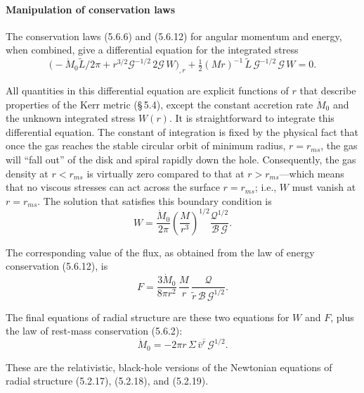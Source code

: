 \paragraph*{Manipulation of conservation laws}
The conservation laws (5.6.6) and (5.6.12) for angular momentum and energy,
when combined, give a differential equation for the integrated stress
%
\begin{equation}
\tag{5.6.13}
\bigl(-\dot{M}_0 \tilde{L}/2\pi
  + r^{3/2}\mathscr{G}^{-1/2}\,2\mathscr{G}\,W\bigr)_{,r}
  + \tfrac{1}{2}(Mr)^{-1}\,\tilde{L}\,\mathscr{G}^{-1/2}\,\mathscr{G}\,W = 0.
\end{equation}

All quantities in this differential equation are explicit functions of $r$ that
describe properties of the Kerr metric (\S\,5.4), except the constant accretion
rate $\dot{M}_0$ and the unknown integrated stress $W(r)$.  It is straightforward to integrate
this differential equation.  The constant of integration is fixed by the physical
fact that once the gas reaches the stable circular orbit of minimum radius,
$r = r_{ms}$, the gas will ``fall out'' of the disk and spiral rapidly down the hole.
Consequently, the gas density at $r < r_{ms}$ is virtually zero compared to that at
$r > r_{ms}$---which means that no viscous stresses can act across the surface $r = r_{ms}$;
i.e., $W$ must vanish at $r = r_{ms}$.  The solution that satisfies this boundary
condition is
%
\begin{equation}
\tag{5.6.14a}
W = \frac{\dot{M}_0}{2\pi}\left(\frac{M}{r^3}\right)^{\!1/2}
  \frac{\mathscr{Q}^{1/2}}{\mathscr{B}\,\mathscr{G}}.
\end{equation}

The corresponding value of the flux, as obtained from the law of energy conserva\-tion
(5.6.12), is
%
\begin{equation}
\tag{5.6.14b}
F = \frac{3\dot{M}_0}{8\pi r^2}\,\frac{M}{r}\,
  \frac{\mathscr{Q}}{\tilde{r}\,\mathscr{B}\,\mathscr{G}^{1/2}}.
\end{equation}

The final equations of radial structure are these two equations for $W$ and $F$,
plus the law of rest-mass conservation (5.6.2):
%
\begin{equation}
\tag{5.6.14c}
\dot{M}_0 = -2\pi r\,\Sigma\,\bar{v}^{\hat{r}}\,\mathscr{G}^{1/2}.
\end{equation}

These are the relativistic, black-hole versions of the Newtonian equations of
radial structure (5.2.17), (5.2.18), and (5.2.19).

